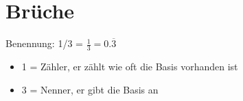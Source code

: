 \section{Brüche}

\hfill \break
Benennung: 1/3 = $\frac{1}{3} = 0.\overline{3}$
\begin{itemize}
    \item 1 = Zähler, er zählt wie oft die Basis vorhanden ist
    \item 3 = Nenner, er gibt die Basis an
\end{itemize}

\hfill \break

\hfill \break

\hfill \break

\hfill \break

\hfill \break

\hfill \break

\hfill \break

